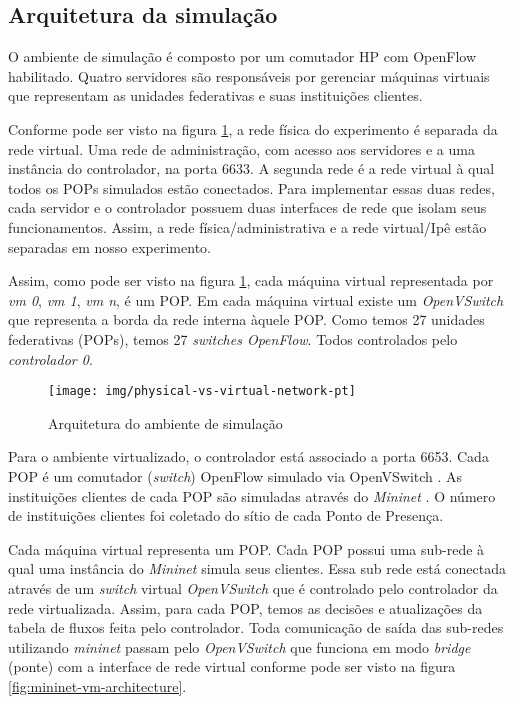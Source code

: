
\subsection{Arquitetura da simulação}

O ambiente de simulação é composto por um comutador HP com OpenFlow habilitado.
Quatro servidores são responsáveis por gerenciar máquinas virtuais que
representam as unidades federativas e suas instituições clientes.

Conforme pode ser visto na figura \ref{fig:physical-vs-virtual-network}, a
rede física do experimento é separada da rede virtual.
Uma rede de administração, com acesso aos servidores e a uma instância do
controlador, na porta 6633.
A segunda rede é a rede virtual à qual todos os POPs simulados estão
conectados.
Para implementar essas duas redes, cada servidor e o controlador possuem duas
interfaces de rede que isolam seus funcionamentos.
Assim, a rede física/administrativa e a rede virtual/Ipê estão separadas
em nosso experimento.

Assim, como pode ser visto na figura \ref{fig:physical-vs-virtual-network},
cada máquina virtual representada por \emph{vm 0}, \emph{vm 1}, \emph{vm n},
é um POP.
Em cada máquina virtual existe um \emph{OpenVSwitch} que representa a borda
da rede interna àquele POP.
Como temos 27 unidades federativas (POPs), temos 27 \emph{switches OpenFlow}.
Todos controlados pelo \emph{controlador 0}.


\begin{figure}[!h]
    \centering
    \label{fig:physical-vs-virtual-network}
    \texttt{[image: img/physical-vs-virtual-network-pt]}
    \caption{Arquitetura do ambiente de simulação}
\end{figure}

Para o ambiente virtualizado, o controlador está associado a porta 6653.
Cada POP é um comutador (\emph{switch}) OpenFlow simulado via OpenVSwitch
\citep{openvswitch2015comutador}.
As instituições clientes de cada POP são simuladas através do \emph{Mininet}
\citep{lantz2010network}.
O número de instituições clientes foi coletado do sítio de cada Ponto de
Presença.

Cada máquina virtual representa um POP.
Cada POP possui uma sub-rede à qual uma instância do \emph{Mininet} simula
seus clientes.
Essa sub rede está conectada através de um \emph{switch} virtual
\emph{OpenVSwitch} que é controlado pelo controlador da rede virtualizada.
Assim, para cada POP, temos as decisões e atualizações da tabela de fluxos
feita pelo controlador.
Toda comunicação de saída das sub-redes utilizando \emph{mininet} passam pelo
\emph{OpenVSwitch} que funciona em modo \emph{bridge} (ponte) com a interface
de rede virtual conforme pode ser visto na figura
\ref{fig:mininet-vm-architecture}.


